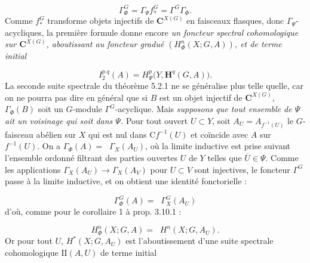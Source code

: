 \clearpage
{}

\begin{equation}
\Gamma_\Phi^G=\Gamma_\Psi f_*^G=\Gamma^G\Gamma_\Phi.
\tag{5.7.3}
\end{equation}
Comme $f_*^G$ transforme objets injectifs de ${\mathbf C}^{X(G)}$ en faisceaux
flasques, donc $\Gamma_\Psi$-acycliques, la première formule donne encore
\textit{un foncteur spectral cohomologique sur ${\mathbf C}^{X(G)}$, aboutissant au
foncteur gradué $(H_\Phi^n(X;G,A))$, et de terme initial}

\begin{equation}
I_2^{p.q}(A)=H_\Psi^p\bigl(Y,\mathbf H^q(G,A)\bigr).
\tag{5.7.4}
\end{equation}
La seconde suite spectrale du théorème 5.2.1 ne se généralise plus telle
quelle, car on ne pourra pas dire en général que si $B$ est un objet injectif
de ${\mathbf C}^{X(G)}$, $\Gamma_\Phi(B)$ soit un $G$-module $\Gamma^G$-acyclique. Mais
\textit{supposons que tout ensemble de $\Psi$ ait un voisinage qui soit dans
$\Psi$.}
Pour tout ouvert $U\subset Y$, soit $A_U=A_{f^{-1}(U)}$ le $G$-faisceau
abélien sur $X$ qui est nul dans $\mathrm C f^{-1}(U)$ et coïncide avec $A$ sur
$f^{-1}(U)$. On a
$\Gamma_\Phi(A)=\mathop{\underset{\to}{\lim}}\Gamma_X(A_U)$, où la limite inductive est prise
suivant l'ensemble ordonné filtrant des parties ouvertes $U$ de $Y$ telles
que $\overline U\in\Psi$. Comme les applications
$\Gamma_X(A_U)\to\Gamma_X(A_V)$ pour $U\subset V$ sont injectives, le foncteur
$\Gamma^G$ passe à la limite inductive, et on obtient une identité
fonctorielle :

\begin{equation}
\Gamma_\Phi^G(A)=\mathop{\underset{\to}{\lim.}}\Gamma_X^G(A_U)
\tag{5.7.5}
\end{equation}
d'où, comme pour le corollaire 1 à prop. 3.10.1 :

\begin{equation}
H_\Phi^n(X;G,A)=\mathop{\underset{\to}{\lim}} H^n(X;G,A_U).
\tag{5.7.6}
\end{equation}
Or pour tout $U$, $H^*(X;G,A_U)$ est l'aboutissement d'une suite spectrale
cohomologique $\mathrm {II}(A,U)$ de terme initial

